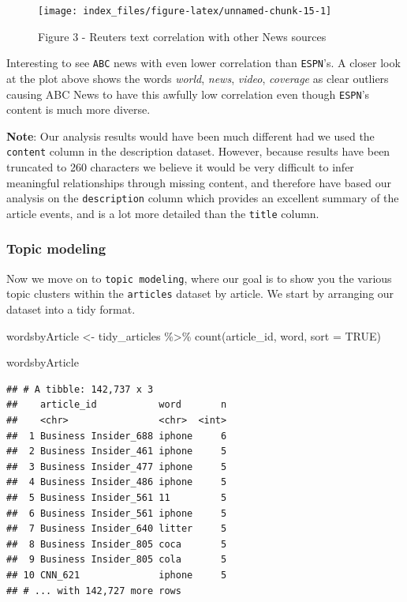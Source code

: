 \documentclass[
]{article}
\newenvironment{Shaded}{\begin{snugshade}}{\end{snugshade}}
\newcommand{\AttributeTok}[1]{\textcolor[rgb]{0.77,0.63,0.00}{#1}}
\newcommand{\ConstantTok}[1]{\textcolor[rgb]{0.00,0.00,0.00}{#1}}
\newcommand{\FunctionTok}[1]{\textcolor[rgb]{0.00,0.00,0.00}{#1}}
\newcommand{\NormalTok}[1]{#1}
\newcommand{\OtherTok}[1]{\textcolor[rgb]{0.56,0.35,0.01}{#1}}
\newcommand{\SpecialCharTok}[1]{\textcolor[rgb]{0.00,0.00,0.00}{#1}}
\begin{document}
\begin{figure}

{\centering \texttt{[image: index\_files/figure-latex/unnamed-chunk-15-1]} 

}

\caption{Figure 3 - Reuters text correlation with other News sources}\label{fig:unnamed-chunk-15}
\end{figure}

Interesting to see \texttt{ABC} news with even lower correlation than
\texttt{ESPN}'s. A closer look at the plot above shows the words
\emph{world}, \emph{news}, \emph{video}, \emph{coverage} as clear
outliers causing ABC News to have this awfully low correlation even
though \texttt{ESPN}'s content is much more diverse.

\textbf{Note}: Our analysis results would have been much different had
we used the \texttt{content} column in the description dataset. However,
because results have been truncated to 260 characters we believe it
would be very difficult to infer meaningful relationships through
missing content, and therefore have based our analysis on the
\texttt{description} column which provides an excellent summary of the
article events, and is a lot more detailed than the \texttt{title}
column.

\hypertarget{topic-modeling}{%
\subsubsection{\texorpdfstring{\textbf{Topic
modeling}}{Topic modeling}}\label{topic-modeling}}

Now we move on to \texttt{topic\ modeling}, where our goal is to show
you the various topic clusters within the \texttt{articles} dataset by
article. We start by arranging our dataset into a tidy format.

\begin{Shaded}
\begin{Highlighting}[]
\NormalTok{wordsbyArticle }\OtherTok{\textless{}{-}}\NormalTok{ tidy\_articles }\SpecialCharTok{\%\textgreater{}\%}
                   \FunctionTok{count}\NormalTok{(article\_id, word, }\AttributeTok{sort =} \ConstantTok{TRUE}\NormalTok{) }

\NormalTok{wordsbyArticle}
\end{Highlighting}
\end{Shaded}

\begin{verbatim}
## # A tibble: 142,737 x 3
##    article_id           word       n
##    <chr>                <chr>  <int>
##  1 Business Insider_688 iphone     6
##  2 Business Insider_461 iphone     5
##  3 Business Insider_477 iphone     5
##  4 Business Insider_486 iphone     5
##  5 Business Insider_561 11         5
##  6 Business Insider_561 iphone     5
##  7 Business Insider_640 litter     5
##  8 Business Insider_805 coca       5
##  9 Business Insider_805 cola       5
## 10 CNN_621              iphone     5
## # ... with 142,727 more rows
\end{verbatim}
\end{document}
